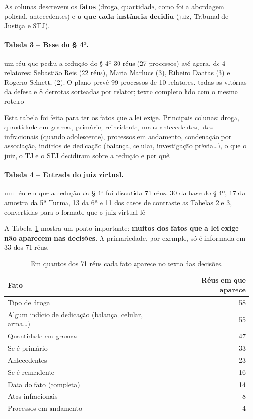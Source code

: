 As colunas descrevem os \textbf{fatos} (droga, quantidade, como foi a abordagem policial,
antecedentes) e \textbf{o que cada instância decidiu} (juiz, Tribunal de Justiça e STJ).

\paragraph*{Tabela 3 -- Base do § 4º.}
      {um réu que pediu a redução do § 4º}
      {30 réus (27 processos) até agora, de 4 relatores: Sebastião Reis (22 réus), Maria Marluce (3), Ribeiro Dantas (3) e Rogerio Schietti (2). O plano prevê 99 processos de 10 relatores.}
      {todas as vitórias da defesa e 8 derrotas sorteadas por relator; texto completo lido com o mesmo roteiro}

Esta tabela foi feita para ter os fatos que a lei exige. Principais colunas:
droga, quantidade em gramas, primário, reincidente, maus antecedentes, atos infracionais
(quando adolescente), processos em andamento, condenação por associação, indícios de
dedicação (balança, celular, investigação prévia\ldots), o que o juiz, o TJ e o STJ decidiram
sobre a redução e por quê.

\paragraph*{Tabela 4 -- Entrada do juiz virtual.}
      {um réu em que a redução do § 4º foi discutida}
      {71 réus: 30 da base do § 4º, 17 da amostra da 5ª Turma, 13 da 6ª e 11 dos casos de contraste}
      {as Tabelas 2 e 3, convertidas para o formato que o juiz virtual lê}

A Tabela~\ref{tab:cobertura} mostra um ponto importante: \textbf{muitos dos fatos que a lei
exige não aparecem nas decisões}. A primariedade, por exemplo, só é informada em 33 dos 71
réus.

\begin{table}[h]
\centering\small
\caption{Em quantos dos 71 réus cada fato aparece no texto das decisões.}
\label{tab:cobertura}
\begin{tabular}{lr}
\toprule
Fato & Réus em que aparece \\
\midrule
Tipo de droga & 58 \\
Algum indício de dedicação (balança, celular, arma\ldots) & 55 \\
Quantidade em gramas & 47 \\
Se é primário & 33 \\
Antecedentes & 23 \\
Se é reincidente & 16 \\
Data do fato (completa) & 14 \\
Atos infracionais & 8 \\
Processos em andamento & 4 \\
\bottomrule
\end{tabular}
\end{table}


